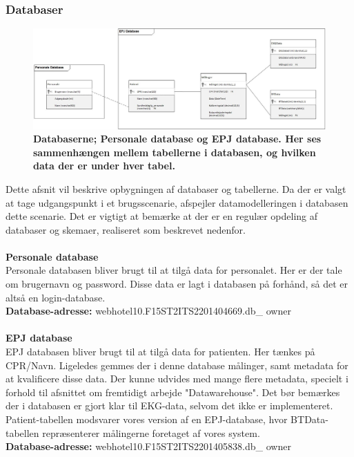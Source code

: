 \subsubsection{Databaser}
\begin{figure}[H]
\includegraphics[width =1.0\textwidth , center]{billeder/databaser}
\caption{\textbf{Databaserne; Personale database og EPJ database. Her ses sammenhængen mellem tabellerne i databasen, og hvilken data der er under hver tabel.}}
\end{figure}
Dette afsnit vil beskrive opbygningen af databaser og tabellerne. Da der er valgt at tage udgangspunkt i et brugsscenarie, afspejler datamodelleringen i databasen dette scenarie. Det er vigtigt at bemærke at der er en regulær opdeling af databaser og skemaer, realiseret som beskrevet nedenfor.
\\\\
\textbf{Personale database}\\
Personale databasen bliver brugt til at tilgå data for personalet. Her er der tale om brugernavn og password. Disse data er lagt i databasen på forhånd, så det er altså en login-database.\\ 
\textbf{Database-adresse:} webhotel10.F15ST2ITS2201404669.db\_ owner
\\\\
\textbf{EPJ database}\\
EPJ databasen bliver brugt til at tilgå data for patienten. Her tænkes på CPR/Navn. Ligeledes gemmes der i denne database målinger, samt metadata for at kvalificere disse data. Der kunne udvides med mange flere metadata, specielt i forhold til afsnittet om fremtidigt arbejde "Datawarehouse". Det bør bemærkes der i databasen er gjort klar til EKG-data, selvom det ikke er implementeret. Patient-tabellen modsvarer vores version af en EPJ-database, hvor BTData-tabellen repræsenterer målingerne foretaget af vores system.\\
\textbf{Database-adresse:} webhotel10.F15ST2ITS2201405838.db\_ owner
\\\\
